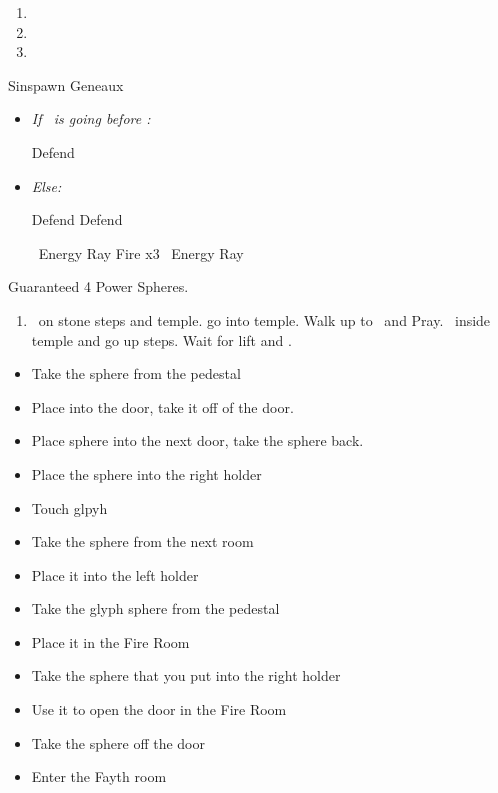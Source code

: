 \begin{enumerate}[resume]
    \item \sd
    \item \formation{\tidus}{\yuna}{\lulu}
    \item \save
\end{enumerate}
\bothvfill\winvfill\lossvfill
\begin{battle}[3000]{Sinspawn Geneaux}
    \begin{itemize}
        \item \textit{If \tidus\ is going before \yuna:}
        \begin{itemize}
            \tidusf Defend
        \end{itemize}
        \item \textit{Else:}
        \begin{itemize}
            \switch{\yuna}{\wakka}
            \wakkaf Defend
            \tidusf Defend
        \end{itemize}
        \summon{\valefor}
        \valeforf \od\ Energy Ray
        \valeforf Fire x3
        \valeforf \od\ Energy Ray
    \end{itemize}
    Guaranteed 4 Power Spheres.
\end{battle}
\begin{enumerate}[resume]
    \item \sd\ on stone steps and temple. go into temple. Walk up to \wakka\ and Pray. \sd\ inside temple and go up steps. Wait for lift and \sd.
\end{enumerate}
\begin{trial}
    \begin{itemize}
        \item Take the sphere from the pedestal
        \item Place into the door, take it off of the door.
        \item Place sphere into the next door, take the sphere back.
        \item Place the sphere into the right holder
        \item Touch glpyh
        \item Take the sphere from the next room
        \item Place it into the left holder
        \item Take the glyph sphere from the pedestal
        \item Place it in the Fire Room
        \item Take the sphere that you put into the right holder
        \item Use it to open the door in the Fire Room
        \item Take the sphere off the door
        \item Enter the Fayth room
    \end{itemize}
\end{trial}
